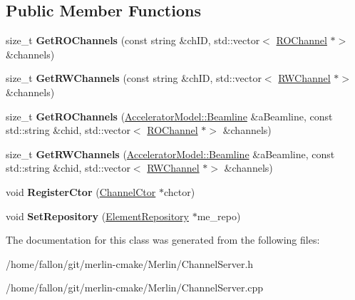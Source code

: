 \subsection*{Public Member Functions}
\begin{DoxyCompactItemize}
\item 
\mbox{\label{classChannelServer_a2974f5201de153453cef0f778f0b0914}} 
size\+\_\+t {\bfseries Get\+R\+O\+Channels} (const string \&ch\+ID, std\+::vector$<$ \hyperlink{classROChannel}{R\+O\+Channel} $\ast$$>$ \&channels)
\item 
\mbox{\label{classChannelServer_aebd556c35a30e712ce4024f500b0b1fb}} 
size\+\_\+t {\bfseries Get\+R\+W\+Channels} (const string \&ch\+ID, std\+::vector$<$ \hyperlink{classRWChannel}{R\+W\+Channel} $\ast$$>$ \&channels)
\item 
\mbox{\label{classChannelServer_ac2ba111c261a2962216be8d494d1f09b}} 
size\+\_\+t {\bfseries Get\+R\+O\+Channels} (\hyperlink{classAcceleratorModel_1_1Beamline}{Accelerator\+Model\+::\+Beamline} \&a\+Beamline, const std\+::string \&chid, std\+::vector$<$ \hyperlink{classROChannel}{R\+O\+Channel} $\ast$$>$ \&channels)
\item 
\mbox{\label{classChannelServer_a6e0745f0faadfc8597c76bb208dd40d1}} 
size\+\_\+t {\bfseries Get\+R\+W\+Channels} (\hyperlink{classAcceleratorModel_1_1Beamline}{Accelerator\+Model\+::\+Beamline} \&a\+Beamline, const std\+::string \&chid, std\+::vector$<$ \hyperlink{classRWChannel}{R\+W\+Channel} $\ast$$>$ \&channels)
\item 
\mbox{\label{classChannelServer_a15dadfefbf4ebb41db8f1c6db8f85b6f}} 
void {\bfseries Register\+Ctor} (\hyperlink{classChannelServer_1_1ChannelCtor}{Channel\+Ctor} $\ast$chctor)
\item 
\mbox{\label{classChannelServer_a73ce366d47580f069d4c44fcf2835d1d}} 
void {\bfseries Set\+Repository} (\hyperlink{classElementRepository}{Element\+Repository} $\ast$me\+\_\+repo)
\end{DoxyCompactItemize}


The documentation for this class was generated from the following files\+:\begin{DoxyCompactItemize}
\item 
/home/fallon/git/merlin-\/cmake/\+Merlin/Channel\+Server.\+h\item 
/home/fallon/git/merlin-\/cmake/\+Merlin/Channel\+Server.\+cpp\end{DoxyCompactItemize}
